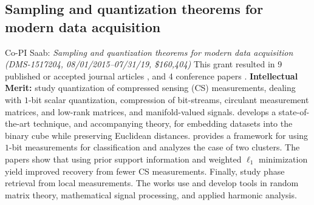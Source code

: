 \documentclass{article}
\begin{document}
\subsection{Sampling and quantization theorems for modern data acquisition}
{Co-PI Saab: \em Sampling and quantization theorems for modern data acquisition (DMS-1517204, 08/01/2015--07/31/19,
\$160,404)} 
This grant resulted in 9 published or accepted journal articles \cite{KSW16, MS16, NSW16, SWY16, NSW17, LS2018, IPSV2018, HS2018, FKS17}, and 4 conference papers \cite{NSW17_conf, FKS17_conf, IPSV17_conf, ILNS19}.  {\bf Intellectual Merit:}  \cite{KSW16, SWY16, FKS17, LS2018, ILNS19} study quantization of compressed sensing (CS) measurements,  dealing with  $1$-bit scalar quantization, compression of  bit-streams,  circulant measurement matrices, and low-rank matrices, and manifold-valued signals. \cite{HS2018} develops a state-of-the-art technique, and accompanying theory, for embedding datasets into the binary cube while preserving Euclidean distances.  \cite{NSW17} provides a framework for using $1$-bit  measurements for classification  and analyzes the case of two clusters. The papers \cite{MS16, NSW16} show that using prior support information and weighted $\ell_1$ minimization yield improved recovery  from fewer CS measurements. Finally, \cite{IPSV2018, IPSV17_conf} study phase retrieval from local measurements. The works use and develop tools in random matrix theory, mathematical signal processing, and applied harmonic analysis.  
\end{document}
